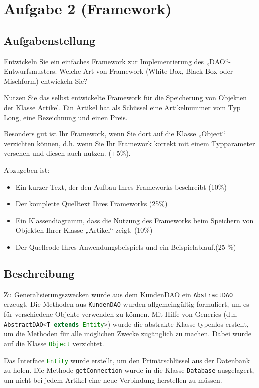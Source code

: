 \section{Aufgabe 2 (Framework)}
\subsection{Aufgabenstellung}
Entwickeln Sie ein einfaches Framework zur Implementierung des „DAO“-Entwurfsmusters.
Welche Art von Framework (White Box, Black Box oder Mischform) entwickeln Sie?

Nutzen Sie das selbst entwickelte Framework für die Speicherung von Objekten der Klasse
Artikel. Ein Artikel hat als Schüssel eine Artikelnummer vom Typ Long, eine Bezeichnung
und einen Preis.

Besonders gut ist Ihr Framework, wenn Sie dort auf die Klasse „Object“ verzichten können,
d.h. wenn Sie Ihr Framework korrekt mit einem Typparameter versehen und diesen auch
nutzen. (+5\%).

Abzugeben ist:
\begin{itemize}
  \item Ein kurzer Text, der den Aufbau Ihres Frameworks beschreibt (10\%)
  \item Der komplette Quelltext Ihres Frameworks (25\%)
  \item Ein Klassendiagramm, dass die Nutzung des Frameworks beim Speichern von
Objekten Ihrer Klasse „Artikel“ zeigt. (10\%)
  \item Der Quellcode Ihres Anwendungsbeispiels und ein Beispielablauf.(25 \%)
\end{itemize}

\subsection{Beschreibung}
Zu Generalisierungszwecken wurde aus dem KundenDAO ein \lstinline[style=java, language=java]{AbstractDAO}
erzeugt. Die Methoden aus \lstinline[style=java, language=java]{KundenDAO} wurden allgemeingültig formuliert, um
es für verschiedene Objekte verwenden zu können. Mit Hilfe von Generics (d.h.
\lstinline[style=java, language=java]{AbstractDAO<T extends Entity>})
wurde die abstrakte Klasse typenlos erstellt, um die Methoden für alle möglichen Zwecke zugänglich zu machen. Dabei wurde auf
die Klasse \lstinline[style=java, language=java]{Object} verzichtet.

Das Interface \lstinline[style=java, language=java]{Entity} wurde erstellt, um den Primärschlüssel aus der
Datenbank zu holen. Die Methode \lstinline[style=java,
language=java]{getConnection} wurde in die Klasse \lstinline[style=java,
language=java]{Database} ausgelagert, um nicht bei jedem Artikel eine neue
Verbindung herstellen zu müssen.

